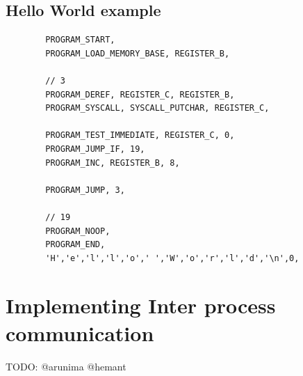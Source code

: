 \documentclass[12pt]{report}
\begin{document}
    \pagebreak
    
    \section{Hello World example}
    \begin{verbatim}
        PROGRAM_START,
        PROGRAM_LOAD_MEMORY_BASE, REGISTER_B,

        // 3
        PROGRAM_DEREF, REGISTER_C, REGISTER_B,
        PROGRAM_SYSCALL, SYSCALL_PUTCHAR, REGISTER_C,
        
        PROGRAM_TEST_IMMEDIATE, REGISTER_C, 0,
        PROGRAM_JUMP_IF, 19,
        PROGRAM_INC, REGISTER_B, 8,

        PROGRAM_JUMP, 3,

        // 19
        PROGRAM_NOOP,
        PROGRAM_END,
        'H','e','l','l','o',' ','W','o','r','l','d','\n',0,
    \end{verbatim}

    \chapter{Implementing Inter process communication}
	TODO: @arunima @hemant
\end{document}
